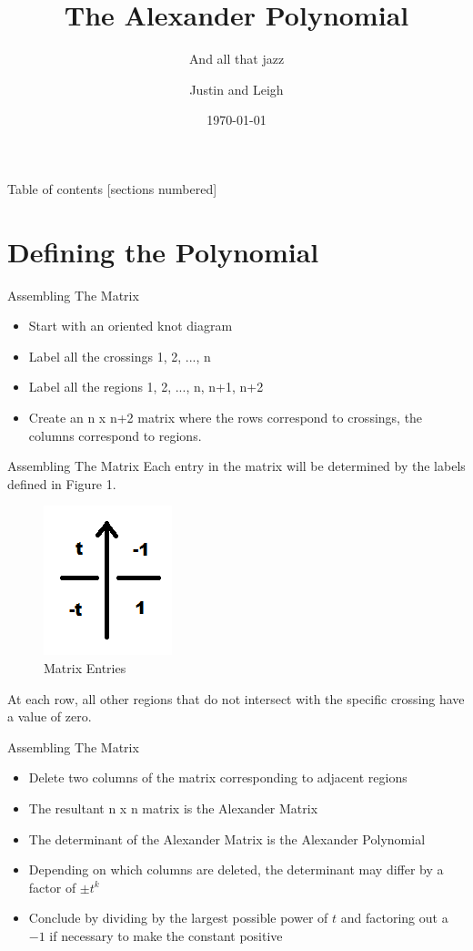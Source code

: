 \documentclass[10pt]{beamer}
\title{The Alexander Polynomial}
\subtitle{And all that jazz}
\date{\today}
\author{Justin and Leigh}
\institute{Seattle University}
\begin{document}
\maketitle

\begin{frame}{Table of contents}
  [sections numbered]
  \tableofcontents[hideallsubsections]
\end{frame}

\section{Defining the Polynomial}

\begin{frame}[fragile]{Assembling The Matrix}
\begin{itemize}
  \item Start with an oriented knot diagram
  \item Label all the crossings 1, 2, ..., n
  \item Label all the regions 1, 2, ..., n, n+1, n+2
  \item Create an n x n+2 matrix where the rows correspond to crossings,
  the columns correspond to regions.
  \end{itemize} 
\end{frame}

\begin{frame}[fragile]{Assembling The Matrix}
  Each entry in the matrix will be determined by the labels defined in Figure 1.
  \begin{figure}
  \includegraphics {crossing_labelings.png}
  \caption{Matrix Entries}
  \end{figure}
  At each row, all other regions that do not intersect with the specific crossing have a value of zero.
\end{frame}

\begin{frame}[fragile]{Assembling The Matrix}
\begin{itemize}
\item Delete two columns of the matrix corresponding to adjacent regions
\item The resultant n x n matrix is the Alexander Matrix
\item The determinant of the Alexander Matrix is the Alexander Polynomial
\item Depending on which columns are deleted, the determinant may differ by a factor of $ \pm t^k $
\item Conclude by dividing by the largest possible power of $t$ and factoring out a $-1$ if necessary to make the constant positive
\end{itemize}
\end{frame}
\end{document}
